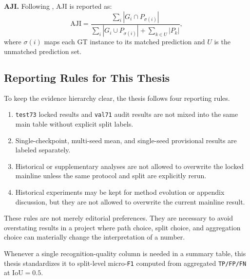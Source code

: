 \textbf{AJI.}
Following \cite{kumar2017aji}, AJI is reported as:
\begin{equation}
\mathrm{AJI}
= \frac{\sum_i |G_i \cap P_{\sigma(i)}|}
{\sum_i |G_i \cup P_{\sigma(i)}| + \sum_{k \in U} |P_k|},
\end{equation}
where $\sigma(i)$ maps each GT instance to its matched prediction and $U$ is the unmatched prediction set.

\subsection{Reporting Rules for This Thesis}\label{reporting-rules-for-this-thesis}

To keep the evidence hierarchy clear, the thesis follows four reporting rules.

\begin{enumerate}
\def\labelenumi{\arabic{enumi}.}
\tightlist
\item
  \texttt{test73} locked results and \texttt{val71} audit results are not mixed into the same main table without explicit split labels.
\item
  Single-checkpoint, multi-seed mean, and single-seed provisional results are labeled separately.
\item
  Historical or supplementary analyses are not allowed to overwrite the locked mainline unless the same protocol and split are explicitly rerun.
\item
  Historical experiments may be kept for method evolution or appendix discussion, but they are not allowed to overwrite the current mainline result.
\end{enumerate}

These rules are not merely editorial preferences. They are necessary to avoid overstating results in a project where path choice, split choice, and aggregation choice can materially change the interpretation of a number.

Whenever a single recognition-quality column is needed in a summary table, this thesis standardizes it to split-level micro-\texttt{F1} computed from aggregated \texttt{TP/FP/FN} at IoU$=0.5$.
